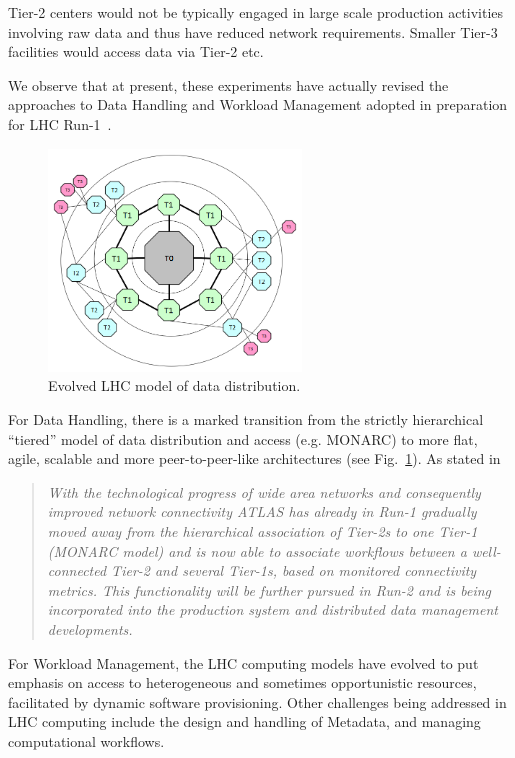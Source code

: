 Tier-2 centers would not be typically engaged in large scale production activities involving raw data and thus
have reduced network requirements. Smaller Tier-3 facilities would access data via Tier-2 etc.

We observe that at present, these experiments have actually revised the approaches to Data Handling and Workload
Management adopted in preparation for LHC Run-1~\cite{lhc_model_update}.
\begin{figure}[h!]
\centering
\includegraphics[width=0.6\textwidth]{un-monarc-model.png}
\caption{Evolved LHC model of data distribution.}
\label{fig:un-monarc}
\end{figure}
For Data Handling, there is a marked transition from the strictly hierarchical
“tiered” model of data distribution and access (e.g. MONARC) to more flat, agile, scalable and more peer-to-peer-like
architectures (see Fig.~\ref{fig:un-monarc}).
As stated in~\cite{lhc_model_update}
\begin{quotation}
\textit{With the technological progress of wide area networks and consequently improved network connectivity ATLAS has
already in Run-1 gradually moved away from the hierarchical association of Tier-2s to one Tier-1 (MONARC model)
and is now able to associate workflows between a well-connected Tier-2 and several Tier-1s, based on monitored
connectivity metrics. This functionality will be further pursued in Run-2 and is being incorporated into the production
system and distributed data management developments.}
\end{quotation}

\noindent
For Workload Management, the LHC computing models have evolved to put emphasis on access to heterogeneous and sometimes
opportunistic resources, facilitated by dynamic software provisioning. Other challenges being addressed in LHC computing include
the design and handling of Metadata, and managing computational workflows.


